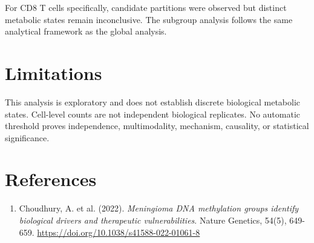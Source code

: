 \documentclass[sloppy]{article}
\begin{document}
For CD8 T cells specifically, candidate partitions were observed but distinct metabolic states remain inconclusive. The subgroup analysis follows the same analytical framework as the global analysis.

\section{Limitations}

This analysis is exploratory and does not establish discrete biological metabolic states. Cell-level counts are not independent biological replicates. No automatic threshold proves independence, multimodality, mechanism, causality, or statistical significance.

\section{References}

\begin{enumerate}
\item Choudhury, A. et al. (2022). \textit{Meningioma DNA methylation groups identify biological drivers and therapeutic vulnerabilities}. Nature Genetics, 54(5), 649-659. \url{https://doi.org/10.1038/s41588-022-01061-8}
\end{enumerate}
\end{document}
